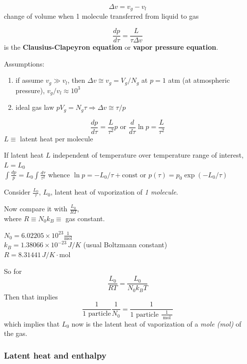 \begin{equation}
  \Delta v = v_g - v_l
\end{equation}
change of volume when 1 molecule transferred from liquid to gas

\begin{equation}
  \frac{dp}{d \tau} = \frac{ L }{ \tau \Delta v}
\end{equation}
is the \textbf{ Clausius-Clapeyron equation} or \textbf{vapor pressure equation}.  

Assumptions:
\begin{enumerate}
  \item[(a)] if assume $v_g \gg v_l$, then $\Delta v \cong v_g = V_g/N_g$ at $p=1$ atm (at atmospheric pressure), $v_g/v_l \approx 10^3$
  \item[(b)] ideal gas law $pV_g = N_g \tau \Longrightarrow \Delta v \cong \tau/p$
\end{enumerate}
\[
\frac{dp}{d\tau} = \frac{L}{\tau^2}p \text{ or } \frac{d}{d\tau} \ln{p} = \frac{L}{\tau^2}
\]
$L \equiv $ latent heat per molecule

If latent heat $L$ independent of temperature over temperature range of interest, $L = L_0$ \\
\phantom{\quad \, } $\int \frac{dp}{p} = L_0 \int \frac{d\tau}{\tau^2}$ whence $\ln{p} = -L_0/\tau + \text{const}$ or $p(\tau) = p_0\exp{ (-L_0/\tau)}$



Consider $\frac{L_0}{\tau}$, $L_0$, latent heat of vaporization of \emph{1 molecule}.  

Now compare it with $\frac{L_0}{RT}$, \\
where $R \equiv N_0 k_B \equiv $ gas constant.  

$N_0 = 6.02205 \times 10^{23} \frac{1}{ \text{mol}}$ \\
$k_B = 1.38066 \times 10^{-23} \, J/K$ (usual Boltzmann constant) \\
$R = 8.31441 \, J/K\cdot \text{mol}$ 

So for 
\[
\frac{L_0}{RT} = \frac{L_0}{N_0 k_B T}
\]
Then that implies
\[
\frac{1}{ 1 \text{ particle} } \frac{1}{N_0} = \frac{1}{ 1 \text{ particle } \frac{1}{ \text{ mol }} }
\]
which implies that $L_0$ now is the latent heat of vaporization of a \emph{mole (mol)} of the gas.  



\subsubsection*{Latent heat and enthalpy}

